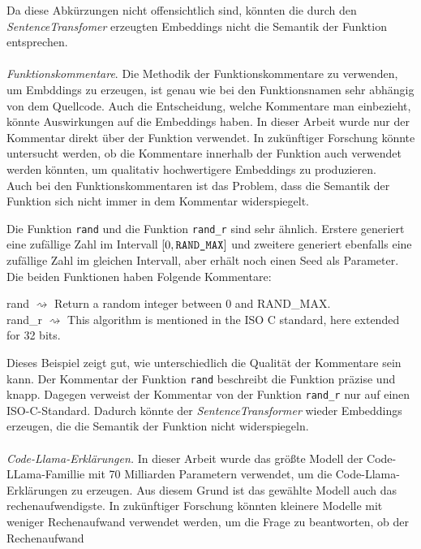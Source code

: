 \documentclass[12pt,letterpaper,ngerman]{article}
\begin{document}
Da diese Abkürzungen nicht offensichtlich sind,
könnten die durch den \textit{SentenceTransfomer} 
erzeugten Embeddings nicht die Semantik der Funktion 
entsprechen.\\\\
\textit{Funktionskommentare}. Die Methodik der 
Funktionskommentare zu verwenden, um Embddings zu erzeugen,
ist genau wie bei den Funktionsnamen sehr abhängig von dem
Quellcode. Auch die Entscheidung, welche Kommentare man 
einbezieht, könnte Auswirkungen auf die Embeddings haben.
In dieser Arbeit wurde nur der Kommentar direkt über der 
Funktion verwendet. In zukünftiger Forschung könnte untersucht 
werden, ob die Kommentare innerhalb der Funktion auch verwendet 
werden könnten, um qualitativ hochwertigere Embeddings zu 
produzieren.\\
Auch bei den Funktionskommentaren ist das Problem, dass die 
Semantik der Funktion sich nicht immer in dem Kommentar
widerspiegelt.
\begin{example}
  Die Funktion \verb|rand| und die Funktion \verb|rand_r| sind 
  sehr ähnlich. Erstere generiert eine zufällige Zahl im 
  Intervall $[0, \verb|RAND_MAX|]$ und zweitere generiert 
  ebenfalls eine zufällige Zahl im gleichen Intervall, aber
  erhält noch einen Seed als Parameter. Die beiden Funktionen
  haben Folgende Kommentare:
  \begin{center}
    rand $\rightsquigarrow$ Return a random integer between 0
      and RAND\_MAX.\\
    rand\_r  $\rightsquigarrow$   This algorithm is mentioned in 
    the ISO C standard, here extended for 32 bits.
  \end{center}
\end{example}
Dieses Beispiel zeigt gut, wie unterschiedlich die Qualität 
der Kommentare sein kann. Der Kommentar der Funktion \verb|rand| 
beschreibt die Funktion präzise und knapp. Dagegen verweist der 
Kommentar von der Funktion \verb|rand_r| nur auf einen 
ISO-C-Standard. Dadurch könnte der \textit{SentenceTransformer} 
wieder Embeddings erzeugen, die die Semantik der Funktion 
nicht widerspiegeln.\\\\
\textit{Code-Llama-Erklärungen.}
In dieser Arbeit wurde das größte Modell der Code-LLama-Famillie 
mit 70 Milliarden Parametern verwendet, um die 
Code-Llama-Erklärungen zu erzeugen. Aus diesem Grund ist das
gewählte Modell auch das rechenaufwendigste. In zukünftiger 
Forschung könnten kleinere Modelle mit weniger Rechenaufwand 
verwendet werden, um die Frage zu beantworten, ob der Rechenaufwand 
\end{document}
